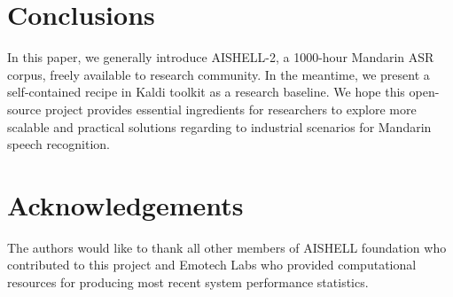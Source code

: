 \documentclass[a4paper]{article}
\begin{document}
%
%

\section{Conclusions}

In this paper, we generally introduce AISHELL-2, a 1000-hour Mandarin ASR corpus, freely available to research community. In the meantime, we present a self-contained recipe in Kaldi toolkit as a research baseline. We hope this open-source project provides essential ingredients for researchers to explore more scalable and practical solutions regarding to industrial scenarios for Mandarin speech recognition.

\section{Acknowledgements}

The authors would like to thank all other members of AISHELL foundation who contributed to this project and Emotech Labs who provided computational resources for producing most recent system performance statistics.




\end{document}

